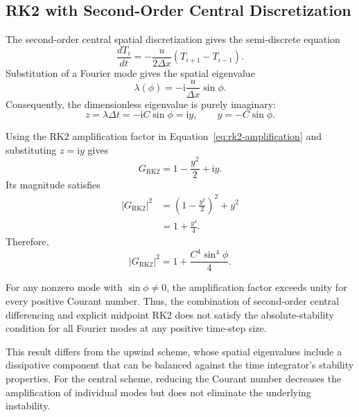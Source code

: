 \subsection{RK2 with Second-Order Central Discretization}
\label{subsec:rk2-central-stability}

The second-order central spatial discretization gives the semi-discrete equation
\begin{equation}
    \frac{dT_i}{dt}
    = -\frac{u}{2\Delta x}\left(T_{i+1}-T_{i-1}\right).
    \label{eq:central2-semidiscrete}
\end{equation}
Substitution of a Fourier mode gives the spatial eigenvalue
\begin{equation}
    \lambda(\phi)=-\mathrm{i}\frac{u}{\Delta x}\sin\phi.
    \label{eq:central2-eigenvalue}
\end{equation}
Consequently, the dimensionless eigenvalue is purely imaginary:
\begin{equation}
    z=\lambda\Delta t=-\mathrm{i}C\sin\phi=\mathrm{i}y,
    \qquad y=-C\sin\phi.
    \label{eq:central2-z}
\end{equation}

Using the RK2 amplification factor in Equation~\eqref{eq:rk2-amplification} and substituting $z=\mathrm{i}y$ gives
\begin{equation}
    G_{\mathrm{RK2}}=1-\frac{y^2}{2}+\mathrm{i}y.
    \label{eq:central2-rk2-amplification}
\end{equation}
Its magnitude satisfies
\begin{align}
    |G_{\mathrm{RK2}}|^2
    &=\left(1-\frac{y^2}{2}\right)^2+y^2 \\
    &=1+\frac{y^4}{4}.
    \label{eq:central2-amplification-magnitude}
\end{align}
Therefore,
\begin{equation}
    \boxed{|G_{\mathrm{RK2}}|^2
    =1+\frac{C^4\sin^4\phi}{4}}.
    \label{eq:central2-rk2-instability}
\end{equation}

For any nonzero mode with $\sin\phi\neq 0$, the amplification factor exceeds unity for every positive Courant number. Thus, the combination of second-order central differencing and explicit midpoint RK2 does not satisfy the absolute-stability condition for all Fourier modes at any positive time-step size.

This result differs from the upwind scheme, whose spatial eigenvalues include a dissipative component that can be balanced against the time integrator's stability properties. For the central scheme, reducing the Courant number decreases the amplification of individual modes but does not eliminate the underlying instability.

